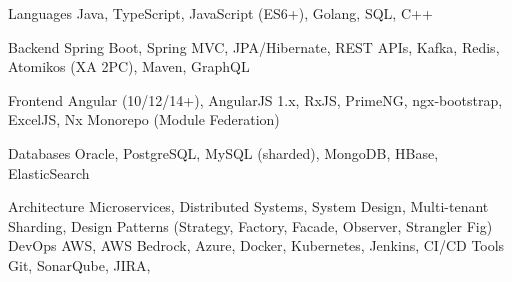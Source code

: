 
\begin{cvskills}
  \cvskill
    {Languages}
    {Java, TypeScript, JavaScript (ES6+), Golang, SQL, C++}

  \cvskill
    {Backend}
    {Spring Boot, Spring MVC, JPA/Hibernate, REST APIs, Kafka, Redis,
               Atomikos (XA 2PC), Maven, GraphQL}

  \cvskill
    {Frontend}
    {Angular (10/12/14+), AngularJS 1.x, RxJS, PrimeNG, ngx-bootstrap,
               ExcelJS, Nx Monorepo (Module Federation)}

  \cvskill
    {Databases}
    {Oracle, PostgreSQL, MySQL (sharded), MongoDB, HBase, ElasticSearch}

  \cvskill
    {Architecture}
    {Microservices, Distributed Systems, System Design, Multi-tenant Sharding,
               Design Patterns (Strategy, Factory, Facade, Observer, Strangler Fig)}
 \cvskill
   {DevOps}
   {AWS, AWS Bedrock, Azure, Docker, Kubernetes, Jenkins, CI/CD}
 \cvskill
    {Tools}
    {Git, SonarQube, JIRA,}
\end{cvskills}